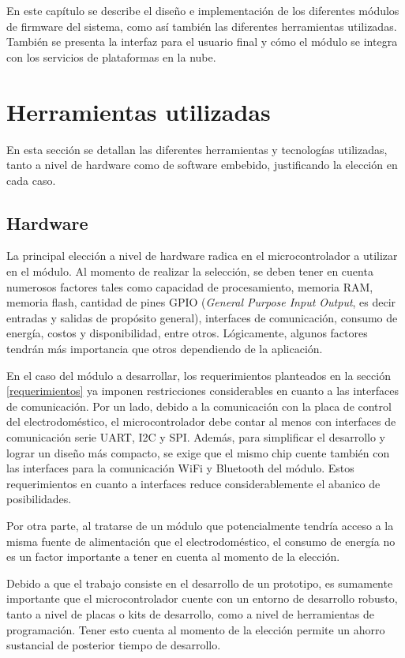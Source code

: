 En este capítulo se describe el diseño e implementación de los diferentes módulos de firmware del sistema, como así también las diferentes herramientas utilizadas. También se presenta la interfaz para el usuario final y cómo el módulo se integra con los servicios de plataformas en la nube.

\section{Herramientas utilizadas}

En esta sección se detallan las diferentes herramientas y tecnologías utilizadas, tanto a nivel de hardware como de software embebido, justificando la elección en cada caso.

\subsection{Hardware}

La principal elección a nivel de hardware radica en el microcontrolador a utilizar en el módulo. Al momento de realizar la selección, se deben tener en cuenta numerosos factores tales como capacidad de procesamiento, memoria RAM, memoria flash, cantidad de pines GPIO (\emph{General Purpose Input Output}, es decir entradas y salidas de propósito general), interfaces de comunicación, consumo de energía, costos y disponibilidad, entre otros. Lógicamente, algunos factores tendrán más importancia que otros dependiendo de la aplicación.

En el caso del módulo a desarrollar, los requerimientos planteados en la sección \ref{requerimientos} ya imponen restricciones considerables en cuanto a las interfaces de comunicación. Por un lado, debido a la comunicación con la placa de control del electrodoméstico, el microcontrolador debe contar al menos con interfaces de comunicación serie UART, I2C y SPI. Además, para simplificar el desarrollo y lograr un diseño más compacto, se exige que el mismo chip cuente también con las interfaces para la comunicación WiFi y Bluetooth del módulo. Estos requerimientos en cuanto a interfaces reduce considerablemente el abanico de posibilidades.

Por otra parte, al tratarse de un módulo que potencialmente tendría acceso a la misma fuente de alimentación que el electrodoméstico, el consumo de energía no es un factor importante a tener en cuenta al momento de la elección.

Debido a que el trabajo consiste en el desarrollo de un prototipo, es sumamente importante que el microcontrolador cuente con un entorno de desarrollo robusto, tanto a nivel de placas o kits de desarrollo, como a nivel de herramientas de programación. Tener esto cuenta al momento de la elección permite un ahorro sustancial de posterior tiempo de desarrollo. 

